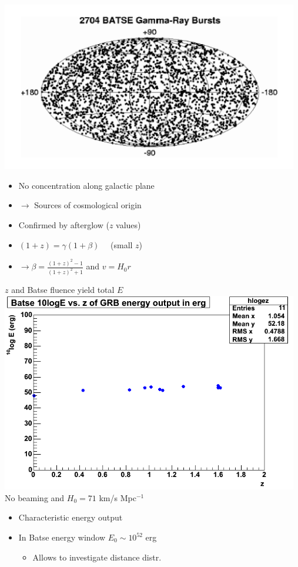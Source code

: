 \Tr
{}%
\begin{center}
\includegraphics[keepaspectratio,width=13cm]{grbmap}
\end{center}
%
\begin{itemize}
\item No concentration along galactic plane
\item[] $\rightarrow$ Sources of cosmological origin
\item[] Confirmed by afterglow ($z$ values)
\item $(1+z)=\gamma(1+\beta) \quad$ (small $z$)
\item[] $\rightarrow \beta=\frac{(1+z)^{2}-1}{(1+z)^{2}+1}$ and $v=H_{0}r$
\end{itemize}
%
\begin{center}
{\red $z$ and Batse fluence yield total $E$}\\[3mm]
\includegraphics[keepaspectratio,width=13cm]{batse-loge-z}\\
No beaming and $H_{0}=71$ km/s Mpc$^{-1}$
\end{center}
%
\begin{itemize}
\item Characteristic energy output 
\item[] In Batse energy window $E_{0} \sim 10^{52}$ erg
\begin{itemize}
\item Allows to investigate distance distr.
\end{itemize}
\end{itemize}

